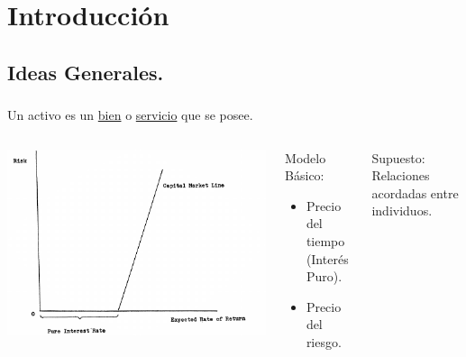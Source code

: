 \documentclass{beamer}
\begin{document}
\portada
{}

\section[1. Introducción.]{Introducción} %

\subsection{Ideas Generales.} %
\begin{frame}[t,fragile]
	\frametitle{\subsecname}
	\begin{definition}
		Un activo es un \underline{bien} o \underline{servicio} que se posee.
	\end{definition}
	\begin{columns}[t]
		\vfill 
		\includegraphics[width= \linewidth]{IMAGES/1/1}
		\hspace{5mm}
		\begin{block}{\centering Modelo Básico:}
			\begin{itemize}
				\item Precio del tiempo (Interés Puro).
				\item Precio del riesgo.
			\end{itemize}
		\end{block}
		\begin{alertblock}{\centering Supuesto:}
			Relaciones acordadas entre individuos.
		\end{alertblock}
	\end{columns}
\end{frame}
\end{document}
